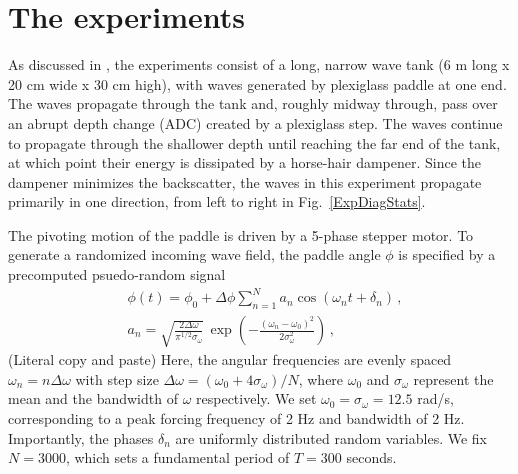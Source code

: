\documentclass[11pt]{article}
\newcommand{\omavg}{\omega_0}
\newcommand{\omsig}{\sigma_{\omega}}
\begin{document}




\section{The experiments}

	As discussed in \cite{bolles2019anomalous}, the experiments consist of a long, narrow wave tank (6 m long x 20 cm wide x 30 cm high), with waves generated by plexiglass paddle at one end. The waves propagate through the tank and, roughly midway through, pass over an abrupt depth change (ADC) created by a plexiglass step. The waves continue to propagate through the shallower depth until reaching the far end of the tank, at which point their energy is dissipated by a horse-hair dampener. Since the dampener minimizes the backscatter, the waves in this experiment propagate primarily in one direction, from left to right in Fig.~\ref{ExpDiagStats}. 

The pivoting motion of the paddle is driven by a 5-phase stepper motor. To generate a randomized incoming wave field, the paddle angle $\phi$ is specified by a precomputed psuedo-random signal
\begin{align}
\label{PaddleAngle}
& \phi(t) = \phi_0 + \Delta \phi \sum_{n=1}^N a_n \cos(\omega_n t+\delta_n) \, , \\
\label{anEq}
& a_n = \sqrt{\frac{2 \Delta \omega}{\pi^{1/2} \omsig}} \, 
\exp \left( -\frac{(\omega_n - \omavg)^2}{2 \omsig^2} \right) \, ,
\end{align}
(Literal copy and paste) Here, the angular frequencies are evenly spaced $\omega_n = n  \Delta \omega$ with step size $ \Delta \omega = (\omavg+4 \omsig)/N$, where $\omavg$ and $\omsig$ represent the mean and the bandwidth of $\omega$ respectively. We set $\omavg = \omsig = 12.5$ rad/s, corresponding to a peak forcing frequency of 2 Hz and bandwidth of 2 Hz. Importantly, the phases $\delta_n$ are uniformly distributed random variables. We fix $N = 3000$, which sets a fundamental period of $T = 300$ seconds.
	
\end{document}
